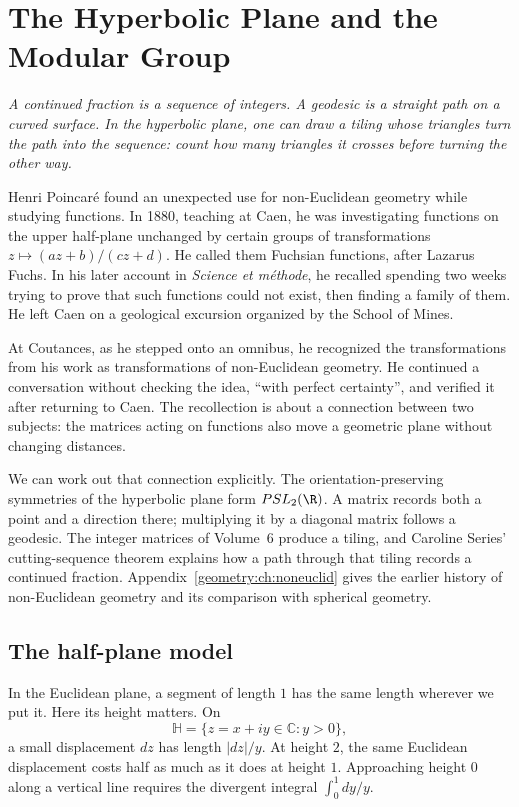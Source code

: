 \chapter{The Hyperbolic Plane and the Modular Group}

\begin{center}\itshape
A continued fraction is a sequence of integers. A geodesic is a straight path on a curved surface. In the hyperbolic plane, one can draw a tiling whose triangles turn the path into the sequence: count how many triangles it crosses before turning the other way.
\end{center}

Henri Poincaré found an unexpected use for non-Euclidean geometry while studying functions. In 1880, teaching at Caen, he was investigating functions on the upper half-plane unchanged by certain groups of transformations $z\mapsto(az+b)/(cz+d)$. He called them Fuchsian functions, after Lazarus Fuchs. In his later account in \emph{Science et méthode}, he recalled spending two weeks trying to prove that such functions could not exist, then finding a family of them. He left Caen on a geological excursion organized by the School of Mines.

At Coutances, as he stepped onto an omnibus, he recognized the transformations from his work as transformations of non-Euclidean geometry. He continued a conversation without checking the idea, ``with perfect certainty'', and verified it after returning to Caen. The recollection is about a connection between two subjects: the matrices acting on functions also move a geometric plane without changing distances.

We can work out that connection explicitly. The orientation-preserving symmetries of the hyperbolic plane form $PSL_2(\R)$. A matrix records both a point and a direction there; multiplying it by a diagonal matrix follows a geodesic. The integer matrices of Volume~6 produce a tiling, and Caroline Series' cutting-sequence theorem explains how a path through that tiling records a continued fraction. Appendix~\ref{geometry:ch:noneuclid} gives the earlier history of non-Euclidean geometry and its comparison with spherical geometry.

\section{The half-plane model}

In the Euclidean plane, a segment of length $1$ has the same length wherever we put it. Here its height matters. On
\[
\mathbb H=\{z=x+iy\in\mathbb C:y>0\},
\]
a small displacement $dz$ has length $|dz|/y$. At height $2$, the same Euclidean displacement costs half as much as it does at height $1$. Approaching height $0$ along a vertical line requires the divergent integral $\int_0^1dy/y$.

